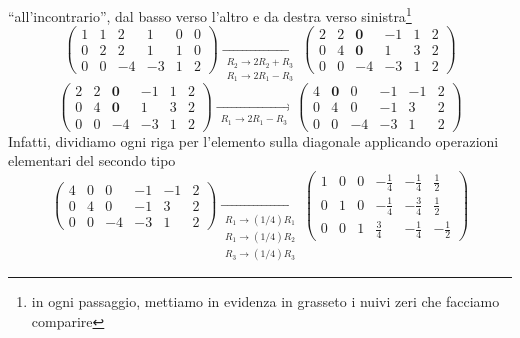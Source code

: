 ``all'incontrario'', dal basso verso l'altro e da destra verso sinistra\footnote{in ogni passaggio, mettiamo in
  evidenza in grasseto i nuivi zeri che facciamo comparire}
\begin{equation*}
   \left(
  \begin{array}{ccc|ccc}
     1 & 1 & 2 &1 &0&0\\
     0 & 2 &2 & 1&1&0\\
     0 & 0 &-4&-3&1&2
  \end{array}\right)
   \underset{
  \begin{matrix}
    R_2\to 2R_2+R_3\\ R_1\to  2R_1-R_3
  \end{matrix}}{\to}
   \left(
  \begin{array}{ccc|ccc}
     2 & 2 & \mathbf{0} &-1 &1&2\\
     0 & 4 &\mathbf{0} & 1&3&2\\
     0 & 0 &-4&-3&1&2
  \end{array}\right)
\end{equation*}
\begin{equation*}
    \left(
  \begin{array}{ccc|ccc}
     2 & 2 & \mathbf{0} &-1 &1&2\\
     0 & 4 &\mathbf{0} & 1&3&2\\
     0 & 0 &-4&-3&1&2
  \end{array}\right)
   \underset{
  \begin{matrix}
    R_1\to  2R_1-R_3
  \end{matrix}}{\to}
    \left(
  \begin{array}{ccc|ccc}
     4 & \mathbf{0} & 0 &-1 &-1&2\\
     0 & 4 &0 & -1&3&2\\
     0 & 0 &-4&-3&1&2
  \end{array}\right)
\end{equation*}
Infatti, dividiamo ogni riga per l'elemento sulla diagonale applicando operazioni elementari del secondo tipo
\begin{equation*}
     \left(
  \begin{array}{ccc|ccc}
     4 & 0 & 0 &-1 &-1&2\\
     0 & 4 &0 & -1&3&2\\
     0 & 0 &-4&-3&1&2
  \end{array}\right)
   \underset{
  \begin{matrix}
    R_1\to (1/4)R_1\\
    R_1\to (1/4)R_2\\
    R_3\to (1/4)R_3
  \end{matrix}}{\to}
\left(
  \begin{array}{ccc|ccc}
    1&0&0&-\frac{1}{4}&-\frac{1}{4}&\frac{1}{2}\\
    0&1&0&-\frac{1}{4}&-\frac{3}{4}&\frac{1}{2}\\
    0 & 0 &1 &\frac{3}{4}&-\frac{1}{4}&-\frac{1}{2}
  \end{array}\right)
\end{equation*}

